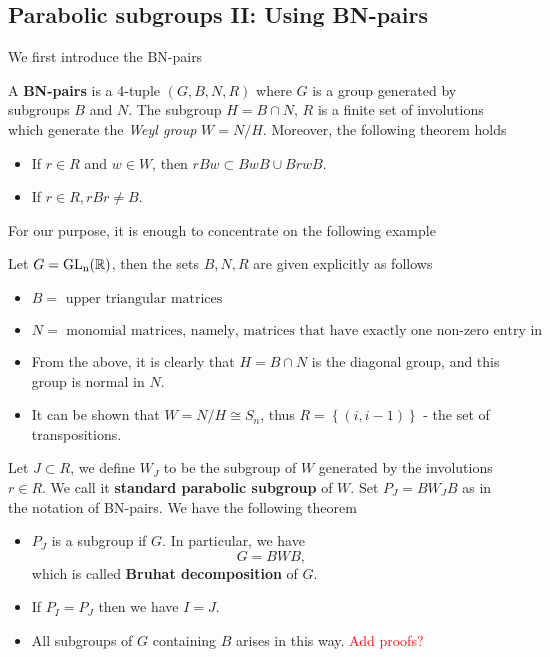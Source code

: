 \subsection{Parabolic subgroups II: Using BN-pairs}
We first introduce the BN-pairs
\begin{definition}[BN-pairs]
    A \textbf{BN-pairs} is a 4-tuple $(G,B,N,R)$ where $G$ is a group generated by subgroups $B$ and $N$.
    The subgroup $H = B \cap N$, $R$ is a finite set of involutions which generate the \textit{Weyl group} $W= N/H$. Moreover,
    the following theorem holds
    \begin{itemize}
        \item If $ r \in R$ and $w \in W$, then $rBw \subset BwB \cup BrwB$.
        \item If $r \in R, rBr \ne B$.
    \end{itemize}
\end{definition}
For our purpose, it is enough to concentrate on the following example
\begin{example}
    Let $G = \operatorname{\text{GL}_n(\mathbb{R})}$, then the sets $B,N,R$ are given explicitly as follows
    \begin{itemize}
        \item $B = \text{ upper triangular matrices}$
        \item $N = \text{ monomial matrices, namely, matrices that have exactly one non-zero entry in each row and column}$
        \item From the above, it is clearly that $H = B \cap N$ is the diagonal group, and this group is normal in $N$.
        \item It can be shown that $W = N/H \cong S_n$, thus $R = \left\lbrace (i,i-1)\right\rbrace $ - the set of transpositions.
    \end{itemize}
\end{example}
Let $J \subset R$, we define $W_J$ to be the subgroup of $W$ generated by the involutions
$r \in R$. We call it \textbf{standard parabolic subgroup} of $W$. Set $P_J = BW_JB$ as in the notation of
BN-pairs. We have the following theorem
\begin{theorem}
    \hfill
    \begin{itemize}
        \item $P_J$ is a subgroup if $G$. In particular, we have
              \[G = BWB,\]
              which is called \textbf{Bruhat decomposition} of $G$.
        \item If $P_I=P_J$ then we have $I=J$.
        \item All subgroups of $G$ containing $B$ arises in this way. \textcolor{red}{Add proofs?}
    \end{itemize}
\end{theorem}
